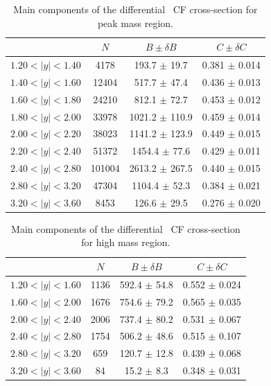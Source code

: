 \begin{table}
\centering
\begin{tabular}{lccc}
\hline
    &   $N$   & $B \pm \delta B$  &  $C \pm \delta C$ \\
\hline
$1.20 < |y| <1.40$          & 4178       & 193.7      $\pm$ 19.7 & 0.381      $\pm$ 0.014 \\
$1.40 < |y| <1.60$          & 12404      & 517.7      $\pm$ 47.4 & 0.436      $\pm$ 0.013 \\
$1.60 < |y| <1.80$          & 24210      & 812.1      $\pm$ 72.7 & 0.453      $\pm$ 0.012 \\
$1.80 < |y| <2.00$          & 33978      & 1021.2     $\pm$ 110.9 & 0.459      $\pm$ 0.014 \\
$2.00 < |y| <2.20$          & 38023      & 1141.2     $\pm$ 123.9 & 0.449      $\pm$ 0.015 \\
$2.20 < |y| <2.40$          & 51372      & 1454.4     $\pm$ 77.6 & 0.429      $\pm$ 0.011 \\
$2.40 < |y| <2.80$          & 101004     & 2613.2     $\pm$ 267.5 & 0.440      $\pm$ 0.015 \\
$2.80 < |y| <3.20$          & 47304      & 1104.4     $\pm$ 52.3 & 0.384      $\pm$ 0.021 \\
$3.20 < |y| <3.60$          & 8453       & 126.6      $\pm$ 29.5 & 0.276      $\pm$ 0.020 \\
\hline
\end{tabular}
\caption{Main components of the differential \Zee\ CF cross-section for peak mass region.}
\label{tab:Zee_NBC_peak}
\end{table}

\begin{table}
\centering
\begin{tabular}{lccc}
\hline
    &   $N$   & $B \pm \delta B$  &  $C \pm \delta C$ \\
\hline
$1.20 < |y| <1.60$          & 1136       & 592.4      $\pm$ 54.8 & 0.552      $\pm$ 0.024 \\
$1.60 < |y| <2.00$          & 1676       & 754.6      $\pm$ 79.2 & 0.565      $\pm$ 0.035 \\
$2.00 < |y| <2.40$          & 2006       & 737.4      $\pm$ 80.2 & 0.531      $\pm$ 0.067 \\
$2.40 < |y| <2.80$          & 1754       & 506.2      $\pm$ 48.6 & 0.515      $\pm$ 0.107 \\
$2.80 < |y| <3.20$          & 659        & 120.7      $\pm$ 12.8 & 0.439      $\pm$ 0.068 \\
$3.20 < |y| <3.60$          & 84         & 15.2       $\pm$ 8.3 & 0.348      $\pm$ 0.031 \\
\hline
\end{tabular}
\caption{Main components of the differential \Zee\ CF cross-section for high mass region.}
\label{tab:Zee_NBC_high}
\end{table}

